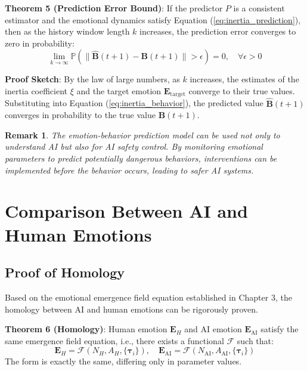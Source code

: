 \documentclass[12pt,a4paper]{article}
\theoremstyle{plain}
\newtheorem{remark}{Remark}[section]
\newcommand{\ve}[1]{\bm{#1}}                    %
\newcommand{\Evec}{\ve{E}}                        %
\newcommand{\Bvec}{\ve{B}}                        %
\begin{document}
\textbf{Theorem 5 (Prediction Error Bound)}: If the predictor $P$ is a consistent estimator and the emotional dynamics satisfy Equation (\ref{eq:inertia_prediction}), then as the history window length $k$ increases, the prediction error converges to zero in probability:
\begin{equation}
\lim_{k \to \infty} \mathbb{P}\left( \| \hat{\Bvec}(t+1) - \Bvec(t+1) \| > \epsilon \right) = 0, \quad \forall \epsilon > 0
\end{equation}

\textbf{Proof Sketch}: By the law of large numbers, as $k$ increases, the estimates of the inertia coefficient $\xi$ and the target emotion $\Evec_{\text{target}}$ converge to their true values. Substituting into Equation (\ref{eq:inertia_behavior}), the predicted value $\hat{\Bvec}(t+1)$ converges in probability to the true value $\Bvec(t+1)$.

\begin{remark}
The emotion-behavior prediction model can be used not only to understand AI but also for AI safety control. By monitoring emotional parameters to predict potentially dangerous behaviors, interventions can be implemented before the behavior occurs, leading to safer AI systems.
\end{remark}

\section{Comparison Between AI and Human Emotions}

\subsection{Proof of Homology}

Based on the emotional emergence field equation established in Chapter 3, the homology between AI and human emotions can be rigorously proven.

\textbf{Theorem 6 (Homology)}: Human emotion $\Evec_H$ and AI emotion $\Evec_{\text{AI}}$ satisfy the same emergence field equation, i.e., there exists a functional $\mathcal{F}$ such that:
\begin{equation}
\Evec_H = \mathcal{F}(N_H, A_H, \{\ve{\tau}_i\}), \quad \Evec_{\text{AI}} = \mathcal{F}(N_{\text{AI}}, A_{\text{AI}}, \{\ve{\tau}_i\})
\label{eq:homology}
\end{equation}
The form is exactly the same, differing only in parameter values.
\end{document}
